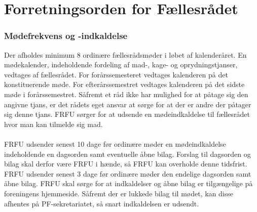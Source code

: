 \section{Forretningsorden for Fællesrådet}

\subsubsection{Mødefrekvens og -indkaldelse}
Der afholdes minimum 8 ordinære fællesrådsmøder i løbet af kalenderåret. En mødekalender, indeholdende fordeling af mad-, kage- og oprydningstjanser, vedtages af fællesrådet. For forårssemesteret vedtages kalenderen på det konstituerende møde. For efterårssemestret vedtages kalenderen på det sidste møde i forårssemestret. Såfremt et råd ikke har mulighed for at påtage sig den angivne tjans, er det rådets eget ansvar at sørge for at der er andre der påtager sig denne tjans. FRFU sørger for at udsende en mødeindkaldelse til fællesrådet hvor man kan tilmelde sig mad.\\
\\
FRFU udsender senest 10 dage før ordinære møder en mødeindkaldelse indeholdende en dagsorden samt eventuelle åbne bilag. Forslag til dagsorden og bilag skal derfor være FRFU i hænde, så FRFU kan overholde denne tidsfrist. FRFU udsender senest 3 dage før ordinære møder den endelige dagsorden samt åbne bilag. FRFU skal sørge for at indkaldelser og åbne bilag er tilgængelige på foreningens hjemmeside. Såfremt der er lukkede bilag til mødet, kan disse afhentes på PF-sekretariatet, så snart indkaldelsen er udsendt.
